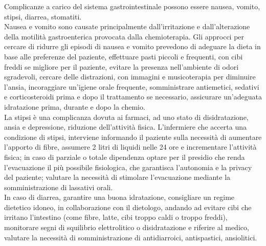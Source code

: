 Complicanze a carico del sistema gastrointestinale possono essere nausea, vomito, stipsi, diarrea, stomatiti.\\
Nausea e vomito sono causate principalmente dall’irritazione e dall’alterazione della motilità gastroenterica 
provocata dalla chemioterapia. Gli approcci per cercare di ridurre gli episodi di nausea e vomito prevedono di 
adeguare la dieta in base alle preferenze del paziente, effettuare pasti piccoli e frequenti, con cibi freddi se 
migliore per il paziente, evitare la presenza nell’ambiente di odori sgradevoli, cercare delle distrazioni, con 
immagini e musicoterapia per diminuire l’ansia, incoraggiare un’igiene orale frequente, somministrare antiemetici, 
sedativi e corticosteroidi prima e dopo il trattamento se necessario, assicurare un’adeguata idratazione prima, 
durante e dopo la chemio\cite{effetticollaterali}.\\

La stipsi è una complicanza dovuta ai farmaci, ad uno stato di disidratazione, ansia e depressione, riduzione 
dell’attività fisica. L’infermiere che accerta una condizione di stipsi, interviene informando il paziente sulla 
necessità di aumentare l’apporto di fibre, assumere 2 litri di liquidi nelle 24 ore e incrementare l’attività fisica; 
in caso di parziale o totale dipendenza optare per il presidio che renda l’evacuazione il più possibile fisiologica, 
che garantisca l’autonomia e la privacy del paziente; valutare la necessità di stimolare l’evacuazione mediante la 
somministrazione di lassativi orali\cite{effetticollaterali}.\\ 

In caso di diarrea, garantire una buona idratazione, consigliare un regime dietetico idoneo, in collaborazione con il 
dietologo, andando ad evitare cibi che irritano l’intestino (come fibre, latte, cibi troppo caldi o troppo freddi), 
monitorare segni di squilibrio elettrolitico o disidratazione e riferire al medico, valutare la necessità di 
somministrazione di antidiarroici, antispastici, ansiolitici\cite{effetticollaterali}.\\

